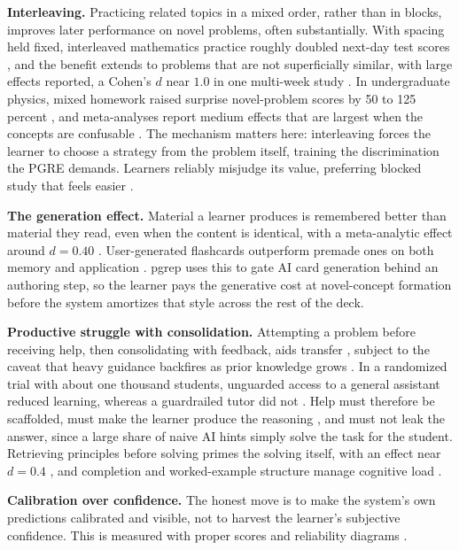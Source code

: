 \documentclass[11pt]{article}
\begin{document}
\textbf{Interleaving.} Practicing related topics in a mixed order, rather than in
blocks, improves later performance on novel problems, often substantially. With
spacing held fixed, interleaved mathematics practice roughly doubled next-day test
scores \citep{taylor2010}, and the benefit extends to problems that are not
superficially similar, with large effects reported, a Cohen's $d$ near $1.0$ in one
multi-week study \citep{rohrer2007, rohrer2014}. In undergraduate physics, mixed
homework raised surprise novel-problem scores by 50 to 125 percent \citep{samani2021},
and meta-analyses report medium effects that are largest when the concepts are
confusable \citep{firth2021, sana2022}. The mechanism matters
here: interleaving forces the learner to choose a strategy from the problem itself,
training the discrimination the PGRE demands. Learners reliably misjudge its value,
preferring blocked study that feels easier \citep{kornell2008}.

\textbf{The generation effect.} Material a learner produces is remembered better than
material they read, even when the content is identical, with a meta-analytic effect
around $d = 0.40$ \citep{slamecka1978, bertsch2007}. User-generated flashcards
outperform premade ones on both memory and application \citep{pan2022flashcards}.
pgrep uses this to gate AI card generation behind an authoring step, so the learner
pays the generative cost at novel-concept formation before the system amortizes that
style across the rest of the deck.

\textbf{Productive struggle with consolidation.} Attempting a problem before receiving
help, then consolidating with feedback, aids transfer \citep{kapur2008, kapur2016},
subject to the caveat that heavy guidance backfires as prior knowledge grows
\citep{kalyuga2007}. In a randomized trial with about one thousand students,
unguarded access to a general assistant reduced learning, whereas a guardrailed tutor
did not \citep{bastani2024}. Help must therefore be scaffolded, must make the learner
produce the reasoning \citep{chi1989}, and must not leak the answer, since a large
share of naive AI hints simply solve the task for the student. Retrieving principles
before solving primes the solving itself, with an effect near $d = 0.4$
\citep{roediger2006, gjerde2022}, and completion and worked-example structure manage
cognitive load \citep{sweller1988, renkl2003}.

\textbf{Calibration over confidence.} The honest move is to make the system's own
predictions calibrated and visible, not to harvest the learner's subjective
confidence. This is measured with proper scores and reliability diagrams
\citep{brier1950, degroot1983, guo2017}.
\end{document}
